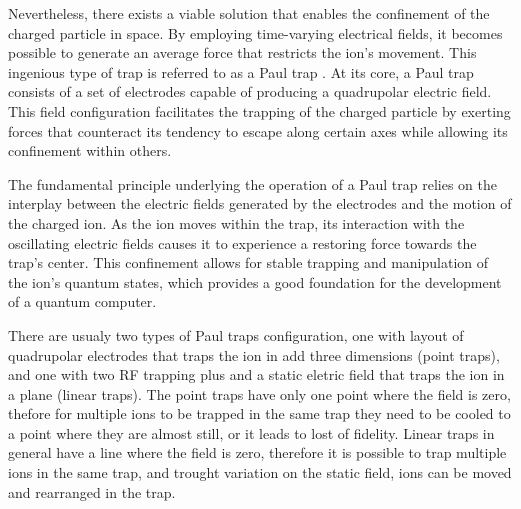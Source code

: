 \documentclass[
  journal=largetwo,
  year=2023,
]{cup-journal}
\begin{document}
Nevertheless, there exists a viable solution that enables the confinement of the charged particle in space. By employing time-varying electrical fields, it becomes possible to generate an average force that restricts the ion's movement. This ingenious type of trap is referred to as a Paul trap \autocite{paul_1953_notizen}. At its core, a Paul trap consists of a set of electrodes capable of producing a quadrupolar electric field. This field configuration facilitates the trapping of the charged particle by exerting forces that counteract its tendency to escape along certain axes while allowing its confinement within others.

The fundamental principle underlying the operation of a Paul trap relies on the interplay between the electric fields generated by the electrodes and the motion of the charged ion. As the ion moves within the trap, its interaction with the oscillating electric fields causes it to experience a restoring force towards the trap's center. This confinement allows for stable trapping and manipulation of the ion's quantum states, which provides a good foundation for the development of a quantum computer.

There are usualy two types of Paul traps configuration, one with layout of quadrupolar electrodes that traps the ion in add three dimensions (point traps), and one with two RF trapping plus and a static eletric field that traps the ion in a plane (linear traps).
The point traps have only one point where the field is zero, thefore for multiple ions to be trapped in the same trap they need to be cooled to a point where they are almost still, or it leads to lost of fidelity.
Linear traps in general have a line where the field is zero, therefore it is possible to trap multiple ions in the same trap, and trought variation on the static field, ions can be moved and rearranged in the trap.
\end{document}
